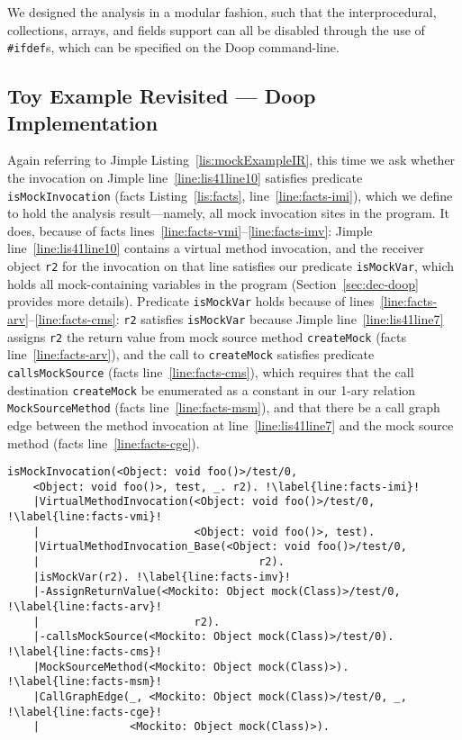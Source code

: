 We designed the analysis in a modular fashion, such that the interprocedural, collections, arrays, and fields support can all be disabled through the use of \verb+#ifdef+s, which can be specified on the Doop command-line.

\subsection{Toy Example Revisited --- Doop Implementation}
\label{subsec:toy-example-doop}

Again referring to Jimple Listing~\ref{lis:mockExampleIR}, this time we ask whether the invocation on Jimple line~\ref{line:lis41line10} satisfies predicate \texttt{isMockInvocation} (facts Listing~\ref{lis:facts}, line~\ref{line:facts-imi}), which we define to hold the analysis result---namely, all mock invocation sites in the program. It does, because of facts lines~\ref{line:facts-vmi}--\ref{line:facts-imv}: Jimple line~\ref{line:lis41line10} contains a virtual method invocation, and the receiver object \texttt{r2} for the invocation on that line satisfies our predicate \texttt{isMockVar}, which holds all mock-containing variables in the program (Section~\ref{sec:dec-doop} provides more details). Predicate \texttt{isMockVar} holds because of lines~\ref{line:facts-arv}--\ref{line:facts-cms}: \texttt{r2} satisfies \texttt{isMockVar} because Jimple line~\ref{line:lis41line7} assigns \texttt{r2} the return value from mock source method \texttt{createMock} (facts line~\ref{line:facts-arv}), and the call to \texttt{createMock} satisfies predicate \texttt{callsMockSource} (facts line~\ref{line:facts-cms}), which requires that the call destination \texttt{createMock} be enumerated as a constant in our 1-ary relation \texttt{MockSourceMethod} (facts line~\ref{line:facts-msm}), and that there be a call graph edge between the method invocation at line~\ref{line:lis41line7} and the mock source method (facts line~\ref{line:facts-cge}).


\begin{lstlisting}[basicstyle=\ttfamily, caption={Facts about invocation \texttt{r2.foo()} in method \texttt{test}.},
basicstyle=\ttfamily, framesep=4.5mm, framexleftmargin=1.0mm, captionpos=b, label=lis:facts, escapechar=!, morekeywords={@Test}]
	isMockInvocation(<Object: void foo()>/test/0, 
	<Object: void foo()>, test, _. r2). !\label{line:facts-imi}!
	|VirtualMethodInvocation(<Object: void foo()>/test/0, !\label{line:facts-vmi}!
	|                        <Object: void foo()>, test).
	|VirtualMethodInvocation_Base(<Object: void foo()>/test/0, 
	|                                  r2).
	|isMockVar(r2). !\label{line:facts-imv}!
	|-AssignReturnValue(<Mockito: Object mock(Class)>/test/0, !\label{line:facts-arv}!
	|                        r2). 
	|-callsMockSource(<Mockito: Object mock(Class)>/test/0). !\label{line:facts-cms}!
	|MockSourceMethod(<Mockito: Object mock(Class)>). !\label{line:facts-msm}!
	|CallGraphEdge(_, <Mockito: Object mock(Class)>/test/0, _, !\label{line:facts-cge}!
	|              <Mockito: Object mock(Class)>). 
\end{lstlisting}


